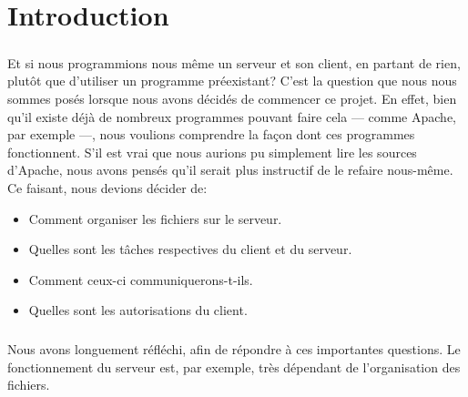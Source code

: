 \documentclass[12pt,a4paper,twoside]{article}
\begin{document}
	\maketitle{}
	\renewcommand{\contentsname}{Sommaire} %
	\tableofcontents{}
	\newpage{}
	\section{Introduction} %
		\subparagraph*{}
			Et si nous programmions nous même un serveur et son client, en partant de rien, plutôt que d'utiliser un programme préexistant? C'est la question que nous nous sommes posés lorsque nous avons décidés de commencer ce projet. En effet, bien qu'il existe déjà de nombreux programmes pouvant faire cela — comme Apache, par exemple —, nous voulions comprendre la façon dont ces programmes fonctionnent. S'il est vrai que nous aurions pu simplement lire les sources d'Apache, nous avons pensés qu'il serait plus instructif de le refaire nous-même. Ce faisant, nous devions décider de:
			\begin{itemize}
				\item{} Comment organiser les fichiers sur le serveur.
				\item{} Quelles sont les tâches respectives du client et du serveur.
				\item{} Comment ceux-ci communiquerons-t-ils.
				\item{} Quelles sont les autorisations du client.
			\end{itemize}
		\subparagraph*{}
			Nous avons longuement réfléchi, afin de répondre à ces importantes questions. Le fonctionnement du serveur est, par exemple, très dépendant de l'organisation des fichiers.
\end{document}
